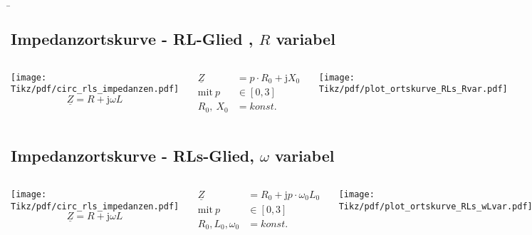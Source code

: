 \b{
\subsection{Impedanzortskurve - RL-Glied , $R$ variabel}
\begin{frame}\ftx{\subsecname}
\begin{columns}
    \centering
    \texttt{[image: Tikz/pdf/circ\_rls\_impedanzen.pdf]}\hfill%
    \begin{equation*}
        \underline{Z}=R+\mathrm{j}\omega L
    \end{equation*}

    \begin{align*}
        \underline{Z} &= p \cdot R_0 + \mathrm{j}X_0\\
        \text{mit}\ p &\in [0,3]\\
        R_0,\ X_0 &= konst.
    \end{align*}

    \texttt{[image: Tikz/pdf/plot\_ortskurve\_RLs\_Rvar.pdf]}
\end{columns}
\end{frame}

\subsection{Impedanzortskurve - RLs-Glied, $\omega$ variabel}
\begin{frame}\ftx{\subsecname}
\begin{columns}
    \centering
    \texttt{[image: Tikz/pdf/circ\_rls\_impedanzen.pdf]}\hfill%
    \begin{equation*}
        \underline{Z}=R+\mathrm{j}\omega L
    \end{equation*}

    \begin{align*}
        \underline{Z} &= R_0 + \mathrm{j}p \cdot \omega_0L_0\\ 
        \text{mit}\ p &\in [0,3]\\
        R_0, L_0, \omega_0 &= konst.
    \end{align*}

    \texttt{[image: Tikz/pdf/plot\_ortskurve\_RLs\_wLvar.pdf]}
\end{columns}
\end{frame}
}%

